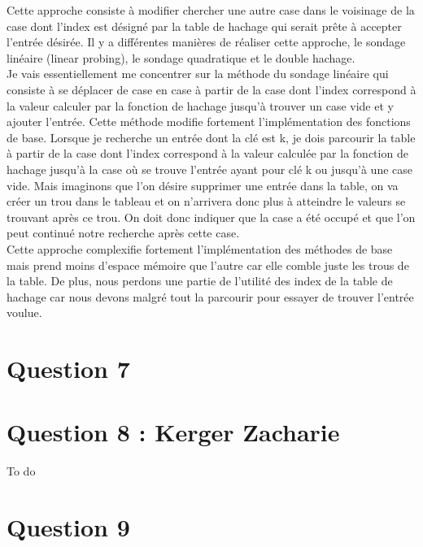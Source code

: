 \documentclass[10pt,a4paper]{article}
\begin{document}
 Cette approche consiste à modifier chercher une autre case dans le voisinage de la case dont l'index est désigné par la table de hachage qui serait prête à accepter l'entrée désirée. Il y a différentes manières de réaliser cette approche, le sondage linéaire (linear probing), le sondage quadratique et le double hachage. \\

Je vais essentiellement me concentrer sur la méthode du sondage linéaire qui consiste à se déplacer de case en case à partir de la case dont l'index correspond à la valeur calculer par la fonction de hachage jusqu'à trouver un case vide et y ajouter l'entrée. Cette méthode modifie fortement l'implémentation des fonctions de base. Lorsque je recherche un entrée dont la clé est k, je dois parcourir la table à partir de la case dont l'index correspond à la valeur calculée par la fonction de hachage jusqu'à la case où se trouve l'entrée ayant pour clé k ou jusqu'à une case vide. Mais imaginons que l'on désire supprimer une entrée dans la table, on va créer un trou dans le tableau et on n'arrivera donc plus à atteindre le valeurs se trouvant après ce trou. On doit donc indiquer que la case a été occupé et que l'on peut continué notre recherche après cette case.\\

Cette approche complexifie fortement l'implémentation des méthodes de base mais prend moins d'espace mémoire que l'autre car elle comble juste les trous de la table. De plus, nous perdons une partie de l'utilité des index de la table de hachage car nous devons malgré tout la parcourir pour essayer de trouver l'entrée voulue.\\
\section*{Question 7}
\section*{Question 8 : Kerger Zacharie}
To do
\section*{Question 9}
\end{document}
